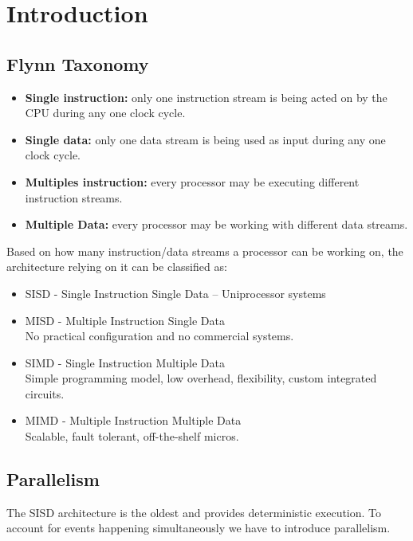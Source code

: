 
\section{Introduction}\label{sec:introduction}

\subsection{Flynn Taxonomy}\label{subsec:flynn-taxonomy}

\begin{itemize}
    \item[] \textbf{Single instruction:} only one instruction stream is being acted on by the CPU during any one clock
    cycle.
    \item[] \textbf{Single data:} only one data stream is being used as input during any one clock cycle.
    \item[] \textbf{Multiples instruction:} every processor may be executing different instruction streams.
    \item[] \textbf{Multiple Data:} every processor may be working with different data streams.
\end{itemize}

Based on how many instruction/data streams a processor can be working on, the architecture relying on it can be
classified as:

\begin{itemize}
    \item SISD - Single Instruction Single Data – Uniprocessor systems
    \item MISD - Multiple Instruction Single Data\\
    No practical configuration and no commercial systems.
    \item SIMD - Single Instruction Multiple Data\\
    Simple programming model, low overhead, flexibility, custom integrated circuits.
    \item MIMD - Multiple Instruction Multiple Data\\
    Scalable, fault tolerant, off-the-shelf micros.
\end{itemize}

\subsection{Parallelism}\label{subsec:parallelism}
The SISD architecture is the oldest and provides deterministic execution.
To account for events happening simultaneously we have to introduce parallelism.

